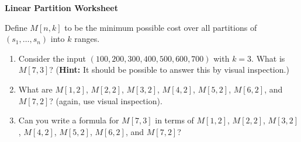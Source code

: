 \documentclass[12pt]{article}
\begin{document}
\newcommand{\I}{\mbox{{\em Int}}}
\newcommand{\lt}{\mbox{{\em left}}}
\newcommand{\rt}{\mbox{{\em right}}}
\newcommand{\ld}{\Delta^l}
\newcommand{\rd}{\Delta^r}
\newcommand{\lsp}[1]{\large\renewcommand{\baselinestretch}{#1}\normalsize}
\newcommand{\hsp}{\hspace{.2in}}

\def\Endwhile{\mbox{\bf endwhile\ }}
\def\Or{\mbox{\bf or\ }}
\def\Do{\mbox{\bf do\ }}
\def\Downto{\mbox{\bf downto\ }}
\def\Int{\mbox{\bf int\ }}
\def\To{\mbox{\bf to\ }}
\def\Repeat{\mbox{\bf repeat\ }}
\def\Until{\mbox{\bf until\ }}
\def\Return{\mbox{\bf return\ }}
\def\Not{\mbox{\bf not\ }}
\def\And{\mbox{\bf and\ }}
\def\For{\mbox{\bf for\ }}
\def\Foreach{\mbox{\bf foreach\ }}
\def\Else{\mbox{\bf else\ }}
\def\Elseif{\mbox{\bf elseif\ }}
\def\End{\mbox{\bf end\ }}
\def\If{\mbox{\bf if\ }}
\def\Mod{\mbox{\bf \ mod\ }}
\def\Then{\mbox{\bf then\ }}
\def\While{\mbox{\bf while\ }}
\def\Output{\mbox{\bf output\ }}


\lsp{1}
\pagestyle{plain}
\begin{center}
{\bf
Linear Partition Worksheet
}
\end{center}

Define $M[n,k]$ to be the minimum possible cost over all partitions of
$(s_1, \dots, s_n)$ into $k$ ranges. 

\begin{enumerate}
\item Consider the input 
$(100, 200, 300, 400, 500, 600, 700)$ with $k = 3$.
What is $M[7,3]$? ({\bf Hint:} 
It should be possible to answer this by visual inspection.)

\vspace*{1in}

\item What are $M[1,2]$, $M[2,2]$, $M[3,2]$, $M[4,2]$, $M[5,2]$, $M[6,2]$, 
and $M[7,2]$? (again, use visual inspection). 

\vspace*{2in}

\item Can you write a formula for $M[7,3]$ in terms of $M[1,2]$, $M[2,2]$, 
$M[3,2]$, $M[4,2]$, $M[5,2]$, $M[6,2]$, and $M[7,2]$? 

\end{enumerate}
 
\end{document}
